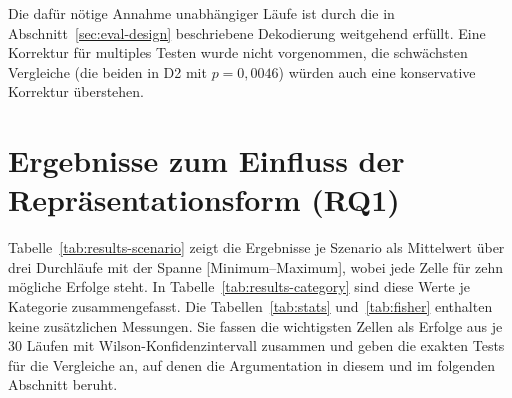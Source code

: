 Die dafür nötige Annahme unabhängiger Läufe ist durch die in Abschnitt~\ref{sec:eval-design} beschriebene Dekodierung weitgehend erfüllt.
Eine Korrektur für multiples Testen wurde nicht vorgenommen, die schwächsten Vergleiche (die beiden in D2 mit $p = 0{,}0046$) würden auch eine konservative Korrektur überstehen.


\section[Ergebnisse zu RQ1]{Ergebnisse zum Einfluss der Repräsentationsform (RQ1)}
\label{sec:eval-rq1}

Tabelle~\ref{tab:results-scenario} zeigt die Ergebnisse je Szenario als Mittelwert über drei Durchläufe mit der Spanne [Minimum--Maximum], wobei jede Zelle für zehn mögliche Erfolge steht.
In Tabelle~\ref{tab:results-category} sind diese Werte je Kategorie zusammengefasst.
Die Tabellen~\ref{tab:stats} und~\ref{tab:fisher} enthalten keine zusätzlichen Messungen.
Sie fassen die wichtigsten Zellen als Erfolge aus je 30 Läufen mit Wilson-Konfidenzintervall zusammen und geben die exakten Tests für die Vergleiche an, auf denen die Argumentation in diesem und im folgenden Abschnitt beruht.

